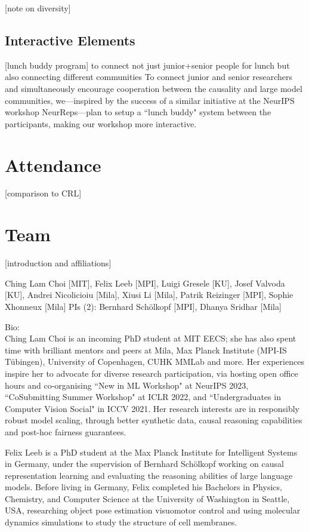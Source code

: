 \documentclass{article}
\begin{document}
[note on diversity]

\subsection{Interactive Elements}


[lunch buddy program] to connect not just junior+senior people for lunch but also connecting different communities
    To connect junior and senior researchers and simultaneously encourage cooperation between the causality and large model communities, we---inspired by the success of a similar initiative at the NeurIPS workshop NeurReps---plan to setup a ``lunch buddy" system between the participants, making our workshop more interactive.

\section{Attendance}

[comparison to CRL]

\section{Team}

[introduction and affiliations]

Ching Lam Choi [MIT], Felix Leeb [MPI], Luigi Gresele [KU], Josef Valvoda [KU],  Andrei Nicolicioiu [Mila], Xiusi Li [Mila], Patrik Reizinger [MPI], Sophie Xhonneux [Mila]
PIs (2): Bernhard Schölkopf [MPI], Dhanya Sridhar [Mila]

Bio:\\

Ching Lam Choi is an incoming PhD student at MIT EECS; she has also spent time with brilliant mentors and peers at Mila, Max Planck Institute (MPI-IS Tübingen), University of Copenhagen, CUHK MMLab and more. Her experiences inspire her to advocate for diverse research participation, via hosting open office hours and co-organising ``New in ML Workshop" at NeurIPS 2023, ``CoSubmitting Summer Workshop" at ICLR 2022, and ``Undergraduates in Computer Vision Social" in ICCV 2021. Her research interests are in responsibly robust model scaling, through better synthetic data, causal reasoning capabilities and post-hoc fairness guarantees.

Felix Leeb is a PhD student at the Max Planck Institute for Intelligent Systems in Germany, under the supervision of Bernhard Schölkopf working on causal representation learning and evaluating the reasoning abilities of large language models. Before living in Germany, Felix completed his Bachelors in Physics, Chemistry, and Computer Science at the University of Washington in Seattle, USA, researching object pose estimation visuomotor control and using molecular dynamics simulations to study the structure of cell membranes.
\end{document}
